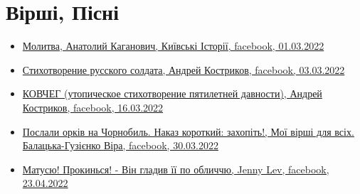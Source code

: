  
 
 
 
 

\section{Вірші, Пісні}
\label{sec:topics.vojna.poezia}

\begin{itemize} %

\item \hyperlink{01_03_2022.fb.fb_group.story_kiev_ua.1.molitva}{%
Молитва, Анатолий Каганович, Київські Історії, facebook, 01.03.2022%
}

\item \hyperlink{03_03_2022.fb.kostrikov_andrej.odessa.1.stih_russkogo_soldata}{%
Стихотворение русского солдата, Андрей Костриков, facebook, 03.03.2022%
}

\item \hyperlink{16_03_2022.fb.kostrikov_andrej.odessa.1.kovcheg}{%
КОВЧЕГ (утопическое стихотворение пятилетней давности), Андрей Костриков, facebook, 16.03.2022%
}

\item \hyperlink{30_03_2022.fb.balatska_vira.gostomel.1.orki_chernobyl}{%
Послали орків на Чорнобиль. Наказ короткий: захопіть!, Мої вірші для всіх. Балацька-Гузієнко Віра, %
facebook, 30.03.2022%
}

\item \hyperlink{23_04_2022.fb.jenny_lev.1.matusju_prokynsja}{%
Матусю! Прокинься! - Він гладив її по обличчю, Jenny Lev, facebook, 23.04.2022%
}

\end{itemize} %
